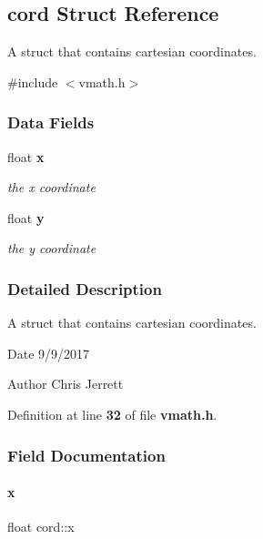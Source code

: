 \subsection{cord Struct Reference}
\label{a00199}


A struct that contains cartesian coordinates.  




{\ttfamily \#include $<$vmath.\+h$>$}

\subsubsection*{Data Fields}
\begin{DoxyCompactItemize}
\item 
float \textbf{ x}
\begin{DoxyCompactList}\small\item\em the x coordinate \end{DoxyCompactList}\item 
float \textbf{ y}
\begin{DoxyCompactList}\small\item\em the y coordinate \end{DoxyCompactList}\end{DoxyCompactItemize}


\subsubsection{Detailed Description}
A struct that contains cartesian coordinates. 

\begin{DoxyDate}{Date}
9/9/2017 
\end{DoxyDate}
\begin{DoxyAuthor}{Author}
Chris Jerrett 
\end{DoxyAuthor}


Definition at line \textbf{ 32} of file \textbf{ vmath.\+h}.



\subsubsection{Field Documentation}
\mbox{\label{a00199_a2eef9b681474b679cf87b0c20eced2cd}} 
\paragraph{x}
{\footnotesize\ttfamily float cord\+::x}



